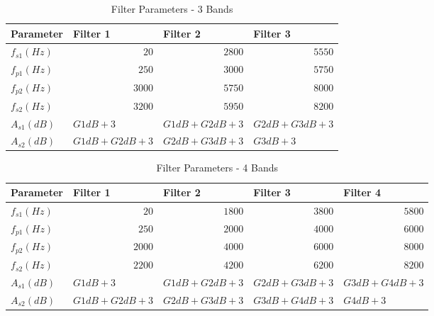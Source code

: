 \documentclass[11pt,onecolumn]{witseiepaper}
\begin{document}
\begin{appendices}
\begin{table}[htbp]
  \centering
  \caption{Filter Parameters - 3 Bands}
    \begin{tabular}{|l|l|l|l|}
    \hline
    \textbf{Parameter} & \textbf{Filter 1} & \textbf{Filter 2} & \textbf{Filter 3} \\
    \hline
    $f_{s1} (Hz)$   & \multicolumn{1}{r|}{$ 20$ } & \multicolumn{1}{r|}{$ 2800$ } & \multicolumn{1}{r|}{$ 5550$ } \\
    \hline
    $f_{p1} (Hz)$   & \multicolumn{1}{r|}{$ 250$ } & \multicolumn{1}{r|}{$ 3000$ } & \multicolumn{1}{r|}{$ 5750$ } \\
    \hline
    $f_{p2} (Hz)$   & \multicolumn{1}{r|}{$ 3000$ } & \multicolumn{1}{r|}{$ 5750$ } & \multicolumn{1}{r|}{$ 8000$ } \\
    \hline
    $f_{s2} (Hz)$   & \multicolumn{1}{r|}{$ 3200$ } & \multicolumn{1}{r|}{$ 5950$ } & \multicolumn{1}{r|}{$ 8200$ } \\
    \hline
    $A_{s1} (dB)$   &$  G1dB + 3$  & $ G1dB + G2dB + 3$  & $ G2dB + G3dB + 3$  \\
    \hline
    $A_{s2} (dB)$   & $ G1dB + G2dB + 3$  & $ G2dB + G3dB + 3 $ & $ G3dB + 3$  \\
    \hline
    \end{tabular}%
  \label{tab:filtPara3Band}%
\end{table}%


\begin{table}[htbp]
  \centering
  \caption{Filter Parameters - 4 Bands}
  \begin{adjustbox}{width=0.9\linewidth}
    \begin{tabular}{|l|l|l|l|l|}
    \hline
    \textbf{Parameter} & \textbf{Filter 1} & \textbf{Filter 2} & \textbf{Filter 3} & \textbf{Filter 4} \\
    \hline
    $f_{s1} (Hz)$   & \multicolumn{1}{r|}{$20$} & \multicolumn{1}{r|}{$1800$} & \multicolumn{1}{r|}{$3800$} & \multicolumn{1}{r|}{$5800$} \\
    \hline
    $f_{p1} (Hz)$   & \multicolumn{1}{r|}{$250$} & \multicolumn{1}{r|}{$2000$} & \multicolumn{1}{r|}{$4000$} & \multicolumn{1}{r|}{$6000$} \\
    \hline
    $f_{p2} (Hz)$   & \multicolumn{1}{r|}{$2000$} & \multicolumn{1}{r|}{$4000$} & \multicolumn{1}{r|}{$6000$} & \multicolumn{1}{r|}{$8000$} \\
    \hline
    $f_{s2} (Hz)$   & \multicolumn{1}{r|}{$2200$} & \multicolumn{1}{r|}{$4200$} & \multicolumn{1}{r|}{$6200$} & \multicolumn{1}{r|}{$8200$} \\
    \hline
    $A_{s1} (dB)  $ &$ G1dB + 3 $&$ G1dB + G2dB + 3 $&$ G2dB + G3dB + 3$ & $G3dB + G4dB + 3$ \\
    \hline
    $A_{s2} (dB)$   & $G1dB + G2dB + 3$ & $G2dB + G3dB + 3 $& $G3dB + G4dB + 3$ &$ G4dB + 3 $\\
    \hline
    \end{tabular}%
    \end{adjustbox}
  \label{tab:filtPara4Band}%
\end{table}%


\end{appendices}
\end{document}
